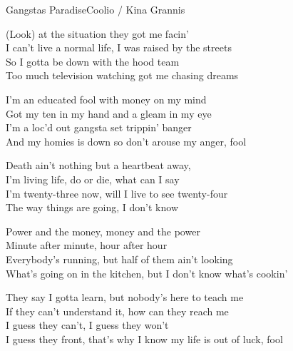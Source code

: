\begin{song}{Gangstas Paradise}{Coolio / Kina Grannis}
\begin{guitar}
(Look) at the situation they got me facin'\\
I can't live a normal life, I was raised by the streets\\
So I gotta be down with the hood team\\
Too much television watching got me chasing dreams\\
\end{guitar}

\begin{guitar}
I'm an educated fool with money on my mind\\
Got my ten in my hand and a gleam in my eye\\
I'm a loc'd out gangsta set trippin' banger\\
And my homies is down so don't arouse my anger, fool\\
\end{guitar}

\begin{guitar}
Death ain't nothing but a heartbeat away,\\
I'm living life, do or die, what can I say\\
I'm twenty-three now, will I live to see twenty-four\\
The way things are going, I don't know\\
\end{guitar}


\begin{guitar}
Power and the money, money and the power\\
Minute after minute, hour after hour\\
Everybody's running, but half of them ain't looking\\
What's going on in the kitchen, but I don't know what's cookin'\\
\end{guitar}

\begin{guitar}
They say I gotta learn, but nobody's here to teach me\\
If they can't understand it, how can they reach me\\
I guess they can't, I guess they won't\\
I guess they front, that's why I know my life is out of luck, fool\\
\end{guitar}




\end{song}
